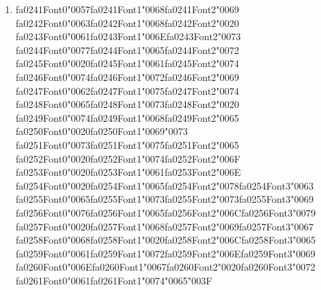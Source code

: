 \documentclass[12pt]{article}
\begin{document}
\begin{enumerate}[label=Q\arabic*.]
 \item {\csname fa0241Font0\endcsname\char"0057}{\csname fa0241Font1\endcsname\char"0068}{\csname fa0241Font2\endcsname\char"0069} {\csname fa0242Font0\endcsname\char"0063}{\csname fa0242Font1\endcsname\char"0068}{\csname fa0242Font2\endcsname\char"0020} {\csname fa0243Font0\endcsname\char"0061}{\csname fa0243Font1\endcsname\char"006E}{\csname fa0243Font2\endcsname\char"0073} {\csname fa0244Font0\endcsname\char"0077}{\csname fa0244Font1\endcsname\char"0065}{\csname fa0244Font2\endcsname\char"0072} {\csname fa0245Font0\endcsname\char"0020}{\csname fa0245Font1\endcsname\char"0061}{\csname fa0245Font2\endcsname\char"0074} {\csname fa0246Font0\endcsname\char"0074}{\csname fa0246Font1\endcsname\char"0072}{\csname fa0246Font2\endcsname\char"0069} {\csname fa0247Font0\endcsname\char"0062}{\csname fa0247Font1\endcsname\char"0075}{\csname fa0247Font2\endcsname\char"0074} {\csname fa0248Font0\endcsname\char"0065}{\csname fa0248Font1\endcsname\char"0073}{\csname fa0248Font2\endcsname\char"0020} {\csname fa0249Font0\endcsname\char"0074}{\csname fa0249Font1\endcsname\char"0068}{\csname fa0249Font2\endcsname\char"0065} {\csname fa0250Font0\endcsname\char"0020}{\csname fa0250Font1\endcsname\char"0069}{\char"0073} {\csname fa0251Font0\endcsname\char"0073}{\csname fa0251Font1\endcsname\char"0075}{\csname fa0251Font2\endcsname\char"0065} {\csname fa0252Font0\endcsname\char"0020}{\csname fa0252Font1\endcsname\char"0074}{\csname fa0252Font2\endcsname\char"006F} {\csname fa0253Font0\endcsname\char"0020}{\csname fa0253Font1\endcsname\char"0061}{\csname fa0253Font2\endcsname\char"006E} {\csname fa0254Font0\endcsname\char"0020}{\csname fa0254Font1\endcsname\char"0065}{\csname fa0254Font2\endcsname\char"0078}{\csname fa0254Font3\endcsname\char"0063} {\csname fa0255Font0\endcsname\char"0065}{\csname fa0255Font1\endcsname\char"0073}{\csname fa0255Font2\endcsname\char"0073}{\csname fa0255Font3\endcsname\char"0069} {\csname fa0256Font0\endcsname\char"0076}{\csname fa0256Font1\endcsname\char"0065}{\csname fa0256Font2\endcsname\char"006C}{\csname fa0256Font3\endcsname\char"0079} {\csname fa0257Font0\endcsname\char"0020}{\csname fa0257Font1\endcsname\char"0068}{\csname fa0257Font2\endcsname\char"0069}{\csname fa0257Font3\endcsname\char"0067} {\csname fa0258Font0\endcsname\char"0068}{\csname fa0258Font1\endcsname\char"0020}{\csname fa0258Font2\endcsname\char"006C}{\csname fa0258Font3\endcsname\char"0065} {\csname fa0259Font0\endcsname\char"0061}{\csname fa0259Font1\endcsname\char"0072}{\csname fa0259Font2\endcsname\char"006E}{\csname fa0259Font3\endcsname\char"0069} {\csname fa0260Font0\endcsname\char"006E}{\csname fa0260Font1\endcsname\char"0067}{\csname fa0260Font2\endcsname\char"0020}{\csname fa0260Font3\endcsname\char"0072} {\csname fa0261Font0\endcsname\char"0061}{\csname fa0261Font1\endcsname\char"0074}{\char"0065}{\char"003F}

\end{enumerate}
\end{document}
